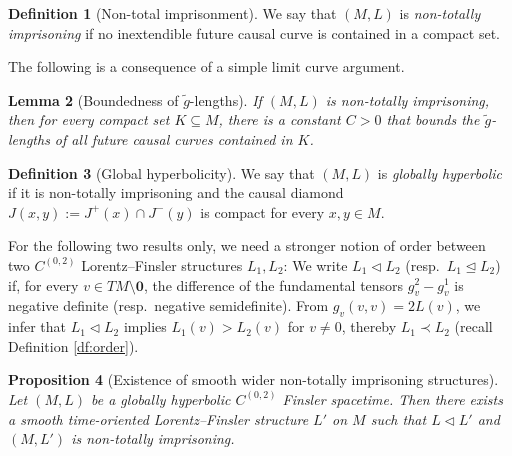 \documentclass[a4paper,11pt]{article}
\numberwithin{equation}{section}
\theoremstyle{definition}
\newtheorem{Definition}{Definition}[section]
\theoremstyle{plain}
\newtheorem{Proposition}[Definition]{Proposition}
\newtheorem{Lemma}[Definition]{Lemma}
\begin{document}
\begin{Definition}[Non-total imprisonment]
    We say that $(M,L)$ is \emph{non-totally imprisoning} if no inextendible future causal curve is contained in a compact set.
\end{Definition}

The following is a consequence of a simple limit curve argument.

\begin{Lemma}[Boundedness of $\tilde g$-lengths]
    If $(M,L)$ is non-totally imprisoning, then for every compact set $K \subseteq M$, there is a constant $C > 0$ that bounds the $\tilde g$-lengths of all future causal curves contained in $K$.
\end{Lemma}

\begin{Definition}[Global hyperbolicity]
We say that $(M,L)$ is \emph{globally hyperbolic} if it is non-totally imprisoning and the causal diamond $J(x,y) := J^+(x) \cap J^-(y)$ is compact for every $x,y \in M$.
\end{Definition}

For the following two results only, we need a stronger notion of order between two $C^{(0,2)}$ Lorentz--Finsler structures $L_1,L_2$:
We write $L_1 \triangleleft L_2$ (resp.\ $L_1 \trianglelefteq L_2$) if, for every $v \in TM \setminus \mathbf 0$, the difference of the fundamental tensors $g^2_v - g^1_v$ is negative definite (resp.\ negative semidefinite).
From $g_v(v,v)=2L(v)$, we infer that $L_1 \triangleleft L_2$ implies $L_1(v)>L_2(v)$ for $v \neq 0$, thereby $L_1 \prec L_2$ (recall Definition \ref{df:order}).

\begin{Proposition}[Existence of smooth wider non-totally imprisoning structures]
    Let $(M,L)$ be a globally hyperbolic $C^{(0,2)}$ Finsler spacetime. 
    Then there exists a smooth time-oriented Lorentz--Finsler structure $L'$ on $M$ such that $L \triangleleft L'$ and $(M,L')$ is non-totally imprisoning.
\end{Proposition}
\end{document}
